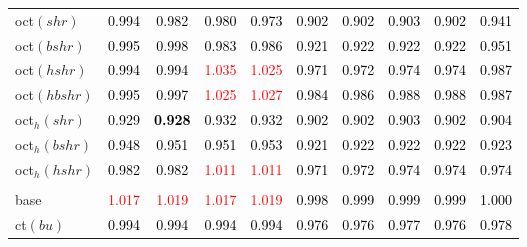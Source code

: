 \begin{tabular}[t]{l|ccccccccc}
oct$(shr)$ & \textcolor{black}{0.994} & \textcolor{black}{0.982} & \textcolor{black}{0.980} & \textcolor{black}{0.973} & \textcolor{black}{0.902} & \textcolor{black}{0.902} & \textcolor{black}{0.903} & \textcolor{black}{0.902} & \textcolor{black}{0.941}\\
oct$(bshr)$ & \textcolor{black}{0.995} & \textcolor{black}{0.998} & \textcolor{black}{0.983} & \textcolor{black}{0.986} & \textcolor{black}{0.921} & \textcolor{black}{0.922} & \textcolor{black}{0.922} & \textcolor{black}{0.922} & \textcolor{black}{0.951}\\
oct$(hshr)$ & \textcolor{black}{0.994} & \textcolor{black}{0.994} & \textcolor{red}{1.035} & \textcolor{red}{1.025} & \textcolor{black}{0.971} & \textcolor{black}{0.972} & \textcolor{black}{0.974} & \textcolor{black}{0.974} & \textcolor{black}{0.987}\\
oct$(hbshr)$ & \textcolor{black}{0.995} & \textcolor{black}{0.997} & \textcolor{red}{1.025} & \textcolor{red}{1.027} & \textcolor{black}{0.984} & \textcolor{black}{0.986} & \textcolor{black}{0.988} & \textcolor{black}{0.988} & \textcolor{black}{0.987}\\
oct$_h(shr)$ & \textcolor{black}{0.929} & \textcolor{black}{\textbf{0.928}} & \textcolor{black}{0.932} & \textcolor{black}{0.932} & \textcolor{black}{0.902} & \textcolor{black}{0.902} & \textcolor{black}{0.903} & \textcolor{black}{0.902} & \textcolor{black}{0.904}\\
oct$_h(bshr)$ & \textcolor{black}{0.948} & \textcolor{black}{0.951} & \textcolor{black}{0.951} & \textcolor{black}{0.953} & \textcolor{black}{0.921} & \textcolor{black}{0.922} & \textcolor{black}{0.922} & \textcolor{black}{0.922} & \textcolor{black}{0.923}\\
oct$_h(hshr)$ & \textcolor{black}{0.982} & \textcolor{black}{0.982} & \textcolor{red}{1.011} & \textcolor{red}{1.011} & \textcolor{black}{0.971} & \textcolor{black}{0.972} & \textcolor{black}{0.974} & \textcolor{black}{0.974} & \textcolor{black}{0.974}\\
\addlinespace[0.3em]
\multicolumn{10}{c}{\textbf{$k = 1$}}\\
base & \textcolor{red}{1.017} & \textcolor{red}{1.019} & \textcolor{red}{1.017} & \textcolor{red}{1.019} & \textcolor{black}{0.998} & \textcolor{black}{0.999} & \textcolor{black}{0.999} & \textcolor{black}{0.999} & \textcolor{black}{1.000}\\
ct$(bu)$ & \textcolor{black}{0.994} & \textcolor{black}{0.994} & \textcolor{black}{0.994} & \textcolor{black}{0.994} & \textcolor{black}{0.976} & \textcolor{black}{0.976} & \textcolor{black}{0.977} & \textcolor{black}{0.976} & \textcolor{black}{0.978}\\

\end{tabular}

